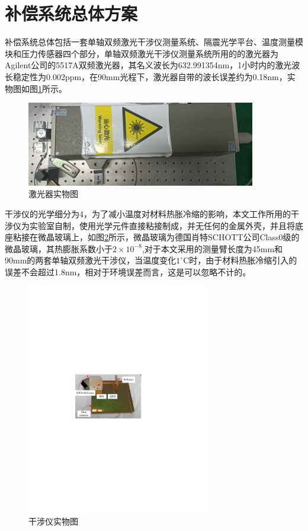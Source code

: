 \section{补偿系统总体方案}
补偿系统总体包括一套单轴双频激光干涉仪测量系统、隔震光学平台、温度测量模块和压力传感器四个部分，单轴双频激光干涉仪测量系统所用的的激光器为Agilent公司的5517A双频激光器，其名义波长为632.991354nm，1小时内的激光波长稳定性为0.002ppm，在90mm光程下，激光器自带的波长误差约为0.18nm，实物图如图\ref{fig:激光器实物图}所示。
\begin{figure}[htb]
    \centering
    \includegraphics[width=10cm]{fig/3-fig/激光器实物图.png}
    \caption{激光器实物图}
    \label{fig:激光器实物图}
\end{figure}

干涉仪的光学细分为4，为了减小温度对材料热胀冷缩的影响，本文工作所用的干涉仪为实验室自制，使用光学元件直接粘接制成，并无任何的金属外壳，并且将底座粘接在微晶玻璃上，如图\ref{fig:干涉仪实物图}所示，微晶玻璃为德国肖特SCHOTT公司Class0级的微晶玻璃，其热膨胀系数小于$2\times 10^{-8}$,对于本文采用的测量臂长度为45mm和90mm的两套单轴双频激光干涉仪，当温度变化$1^{\circ} \mathrm{C}$时，由于材料热胀冷缩引入的误差不会超过1.8nm，相对于环境误差而言，这是可以忽略不计的。
\begin{figure}[htb]
    \centering
    \includegraphics[width=8cm]{fig/3-fig/干涉仪实物图.pdf}
    \caption{干涉仪实物图}
    \label{fig:干涉仪实物图}
\end{figure}

